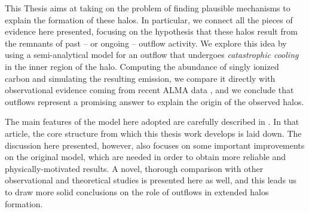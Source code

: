 This Thesis aims at taking on the problem of finding plausible mechanisms to explain the formation of these halos. In particular, we connect all the pieces of evidence here presented, focusing on the hypothesis that these halos result from the remnants of past -- or ongoing -- outflow activity. We explore this idea by using a semi-analytical model for an outflow that undergoes \textit{catastrophic cooling} in the inner region of the halo. Computing the abundance of singly ionized carbon and simulating the resulting \CII emission, we compare it directly with observational evidence coming from recent ALMA data \citep{Fujimoto19, Fujimoto:2020qzo}, and we conclude that outflows represent a promising answer to explain the origin of the observed \CII halos. 

The main features of the model here adopted are carefully described in \citet{Pizzati20}. In that article, the core structure from which this thesis work develops is laid down. The discussion here presented, however, also focuses on some important improvements on the original model, which are needed in order to obtain more reliable and physically-motivated results. A novel, thorough comparison with other observational and theoretical studies is presented here as well, and this leads us to draw more solid conclusions on the role of outflows in extended halos formation.


